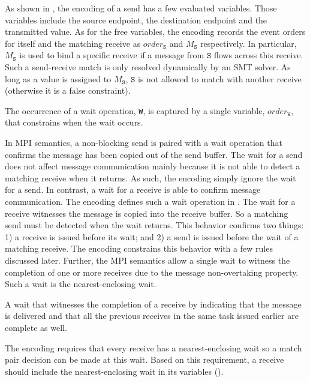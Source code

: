 As shown in , the encoding of a send has a few evaluated variables. Those variables include the source endpoint, the destination endpoint and the transmitted value. As for the free variables, the encoding records the event orders for itself and the matching receive as $\mathit{order}_\mathtt{S}$ and $M_\mathtt{S}$ respectively. In particular, $M_\mathtt{S}$ is used to bind a specific receive if a message from $\mathtt{S}$ flows across this receive. Such a send-receive match is only resolved dynamically by an SMT solver. As long as a value is assigned to $M_\mathtt{S}$, $\mathtt{S}$ is not allowed to match with another receive (otherwise it is a false constraint).

\begin{definition}[Wait] \label{def:wait}
The occurrence of a wait operation, \texttt{W}, is captured by a
single variable, $\mathit{order}_\mathtt{W}$, that constrains when
the wait occurs.
\end{definition}

In MPI semantics, a non-blocking send is paired with a wait operation that confirms the message has been copied out of the send buffer. The wait for a send does not affect message communication mainly because it is not able to detect a matching receive when it returns. As such, the encoding simply ignore the wait for a send. In contrast,  a wait for a receive is able to confirm message communication. The encoding defines such a wait operation in . The wait for a receive witnesses the message is copied into the receive buffer. So a matching send must be detected when the wait returns. This behavior confirms two things: 1) a receive is issued before its wait; and 2) a  send is issued before the wait of a matching receive. The encoding constrains this behavior with a few rules discussed later. Further, the MPI semantics allow a single wait to witness the completion of one or more receives due to the message non-overtaking property. Such a wait is the nearest-enclosing wait. 

\begin{definition} \label{def:nw}
A wait that witnesses the completion of a receive by indicating that
the message is delivered and that all the previous receives in the
same task issued earlier are complete as well.
\end{definition}

The encoding requires that every receive has a nearest-enclosing wait so a match pair decision can be made at this wait. Based on this requirement, a receive should include the nearest-enclosing wait in its variables ().

